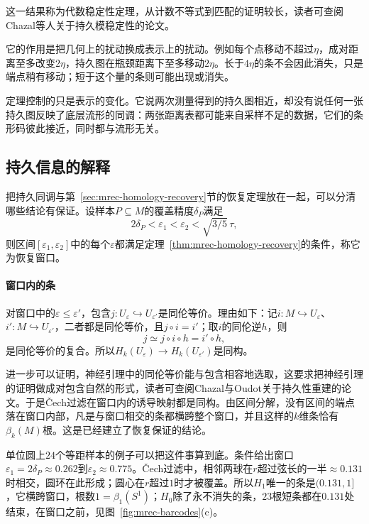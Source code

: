 这一结果称为代数稳定性定理，从计数不等式到匹配的证明较长，读者可查阅Chazal等人关于持久模稳定性的论文。

它的作用是把几何上的扰动换成表示上的扰动。例如每个点移动不超过$\eta$，成对距离至多改变$2\eta$，持久图在瓶颈距离下至多移动$2\eta$。长于$4\eta$的条不会因此消失，只是端点稍有移动；短于这个量的条则可能出现或消失。

定理控制的只是表示的变化。它说两次测量得到的持久图相近，却没有说任何一张持久图反映了底层流形的同调：两张距离表都可能来自采样不足的数据，它们的条形码彼此接近，同时都与流形无关。

\subsection{持久信息的解释}
\label{sec:mrec-persistence-interpretation}

把持久同调与第~\ref{sec:mrec-homology-recovery}节的恢复定理放在一起，可以分清哪些结论有保证。设样本$P\subseteq M$的覆盖精度$\delta_P$满足
\begin{equation}
 2\delta_P<\varepsilon_1<\varepsilon_2<\sqrt{3/5}\,\tau ,
 \label{eq:mrec-recovery-window}
\end{equation}
则区间$[\varepsilon_1,\varepsilon_2]$中的每个$\varepsilon$都满足定理~\ref{thm:mrec-homology-recovery}的条件，称它为恢复窗口。

\paragraph{窗口内的条}

对窗口中的$\varepsilon\leq\varepsilon'$，包含$j:U_\varepsilon\hookrightarrow U_{\varepsilon'}$是同伦等价。理由如下：记$i:M\hookrightarrow U_\varepsilon$、$i':M\hookrightarrow U_{\varepsilon'}$，二者都是同伦等价，且$j\circ i=i'$；取$i$的同伦逆$h$，则
\[
 j\simeq j\circ i\circ h=i'\circ h,
\]
是同伦等价的复合。所以$H_k(U_\varepsilon)\to H_k(U_{\varepsilon'})$是同构。

进一步可以证明，神经引理中的同伦等价能与包含相容地选取，这要求把神经引理的证明做成对包含自然的形式，读者可查阅Chazal与Oudot关于持久性重建的论文。于是Čech过滤在窗口内的诱导映射都是同构。由区间分解，没有区间的端点落在窗口内部，凡是与窗口相交的条都横跨整个窗口，并且这样的$k$维条恰有$\beta_k(M)$根。这是已经建立了恢复保证的结论。

单位圆上$24$个等距样本的例子可以把这件事算到底。条件给出窗口$\varepsilon_1=2\delta_P\approx0.262$到$\varepsilon_2\approx0.775$。Čech过滤中，相邻两球在$r$超过弦长的一半$\approx0.131$时相交，圆环在此形成；圆心在$r$超过$1$时才被覆盖。所以$H_1$唯一的条是$(0.131,1]$，它横跨窗口，根数$1=\beta_1(S^1)$；$H_0$除了永不消失的条，$23$根短条都在$0.131$处结束，在窗口之前，见图~\ref{fig:mrec-barcodes}(c)。

